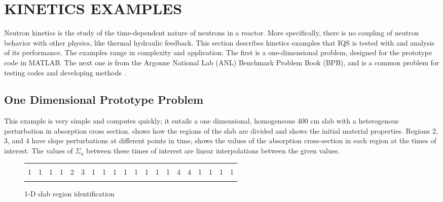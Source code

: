 %
%
%



\chapter{KINETICS EXAMPLES}\label{sect:kin}

Neutron kinetics is the study of the time-dependent nature of neutrons in a reactor.  More specifically, there is no coupling of neutron behavior with other physics, like thermal hydraulic feedback.  This section describes kinetics examples that IQS is tested with and analysis of its performance.  The examples range in complexity and application.  The first is a one-dimensional problem, designed for the prototype code in MATLAB.  The next one is from the Argonne National Lab (ANL) Benchmark Problem Book (BPB), and is a common problem for testing codes and developing methods \cite{ANL_BPB}. 

\section{One Dimensional Prototype Problem}

This example is very simple and computes quickly; it entails a one dimensional, homogeneous 400 cm slab with a heterogenous perturbation in absorption cross section.   shows how the regions of the slab are divided and  shows the initial material properties.  Regions 2, 3, and 4 have slope perturbations at different points in time,  shows the values of the absorption cross-section in each region at the times of interest.  The values of $\Sigma_a$ between these times of interest are linear interpolations between the given values.

\begin{figure}[!htbp]
\begin{center}
\begin{tabular}{| l | l | l | l | l | l | l | l | l | l | l | l | l | l | l | l | l | l | l | l |}
\hline \hline \hline
  &   &   &   &   &   &    &    &   &   &   &   &   &   &   &   &   &   &   &   \\
1 & 1 & 1 & 1 & 2 & 3 & 1 & 1 & 1 & 1 & 1 & 1 & 1 & 1 & 4 & 4 & 1 & 1 & 1 & 1 \\
  &   &   &   &   &   &    &    &   &   &   &   &   &   &   &   &   &   &   &   \\
\hline \hline \hline
\end{tabular}
\caption{1-D slab region identification \cite{PrincePHYSOR2016}}
\label{fig:slab}
\end{center}
\end{figure}

